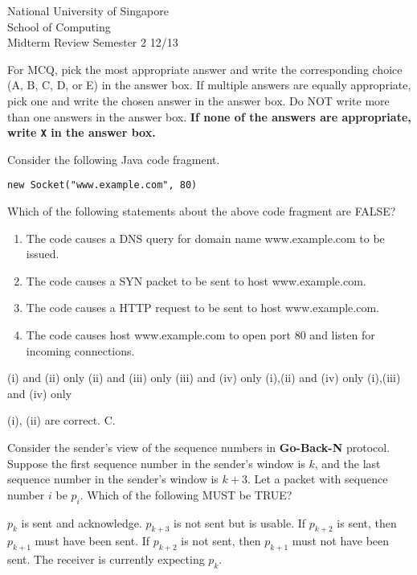 \documentclass[a4paper,11pt,answers]{exam}
\begin{document}
    \extraheadheight{.5in}
    {\large\sf National University of Singapore\\ School of Computing \\
    \LARGE\sf Midterm Review}%
    {\large\sf Semester 2 12/13}
    \firstpageheadrule
    \pagestyle{headandfoot}


\textsf{For MCQ, pick the most appropriate answer and write the corresponding choice (A, B, C, D, or E) in the answer box.  If multiple answers are equally appropriate, pick one and
write the chosen answer in the answer box.  Do NOT write more than one 
answers in the answer box.  \textbf{If none of the answers are appropriate, write \texttt{X} in the answer box.}}


\begin{questions}
\question
Consider the following Java code fragment.
\begin{verbatim}
new Socket("www.example.com", 80)
\end{verbatim}
Which of the following statements about the above code fragment are FALSE?
\renewcommand{\labelenumi}{(\roman{enumi})}
\begin{enumerate}
\item The code causes a DNS query for domain name www.example.com to be issued.
\item The code causes a SYN packet to be sent to host www.example.com.
\item The code causes a HTTP request to be sent to host www.example.com.
\item The code causes host www.example.com to open port 80 and listen for      
incoming connections.
\end{enumerate}

\begin{choices}
\choice (i) and (ii) only
\choice (ii) and (iii) only
\choice (iii) and (iv) only
\choice (i),(ii) and (iv) only
\choice (i),(iii) and (iv) only      
\end{choices}

\begin{solution}
(i), (ii) are correct.  C.
\end{solution}

\question
Consider the sender's view of the sequence numbers in \textbf{Go-Back-N}         protocol.
Suppose the first sequence number in the sender's window is $k$, and the last
sequence number in the sender's window is $k+3$.  Let a packet with sequence
number $i$ be $p_i$.  Which of the following MUST be TRUE?
\begin{choices}
\choice $p_k$ is sent and acknowledge.
\choice $p_{k+3}$ is not sent but is usable.
\choice If $p_{k+2}$ is sent, then $p_{k+1}$ must have been sent.
\choice If $p_{k+2}$ is not sent, then $p_{k+1}$ must not have been sent.
\choice The receiver is currently expecting $p_k$.
\end{choices}


\end{questions}
\end{document}
